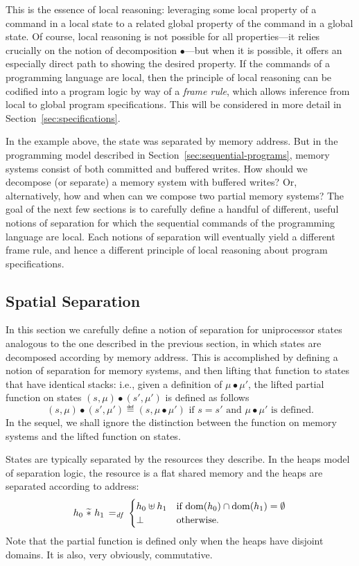 \documentclass[11pt]{report}
\begin{document}
This is the essence of local reasoning: leveraging some local property of a command in a local state to a related global property of the command in a global state. Of course, local reasoning is not possible for all properties---it relies crucially on the notion of decomposition $\bullet$---but when it is possible, it offers an especially direct path to showing the desired property. If the commands of a programming language are local, then the principle of local reasoning can be codified into a program logic by way of a \emph{frame rule}, which allows inference from local to global program specifications. This will be considered in more detail in Section~\ref{sec:specifications}. 

In the example above, the state was separated by memory address. But in the programming model described in Section~\ref{sec:sequential-programs}, memory systems consist of both committed and buffered writes. How should we decompose (or separate) a memory system with buffered writes? Or, alternatively, how and when can we compose two partial memory systems? The goal of the next few sections is to carefully define a handful of different, useful notions of separation for which the sequential commands of the programming language are local. Each notions of separation will eventually yield a different frame rule, and hence a different principle of local reasoning about program specifications. 

\subsection{Spatial Separation}
\label{sec:sequential-spatial-separation}

In this section we carefully define a notion of separation for uniprocessor states analogous to the one described in the previous section, in which states are decomposed according by memory address. This is accomplished by defining a notion of separation for memory systems, and then lifting that function to states that have identical stacks: i.e., given a definition of $\mu \bullet \mu'$, the lifted partial function on states $(s,\mu) \bullet (s',\mu')$ is defined as follows \[ (s,\mu) \bullet (s',\mu') \eqdef (s,\mu \bullet \mu') \text{~if $s = s'$ and $\mu \bullet \mu'$ is defined.}\] In the sequel, we shall ignore the distinction between the function on memory systems and the lifted function on states. 

States are typically separated by the resources they describe. In the heaps model of separation logic, the resource is a flat shared memory and the heaps are separated according to address: \[ h_0 \operatorname{\,\widetilde{\ast}\,} h_1 \operatorname{\;=_{\mathit{df}}\;} \begin{cases}
    h_0 \uplus h_1 & \text{if $\operatorname{\mathrm{dom}}(h_0) \cap \operatorname{\mathrm{dom}}(h_1) = \operatorname{\emptyset}$} \\ 
    \bot & \text{otherwise.}
\end{cases}\] Note that the partial function is defined only when the heaps have disjoint domains. It is also, very obviously, commutative. 
\end{document}

